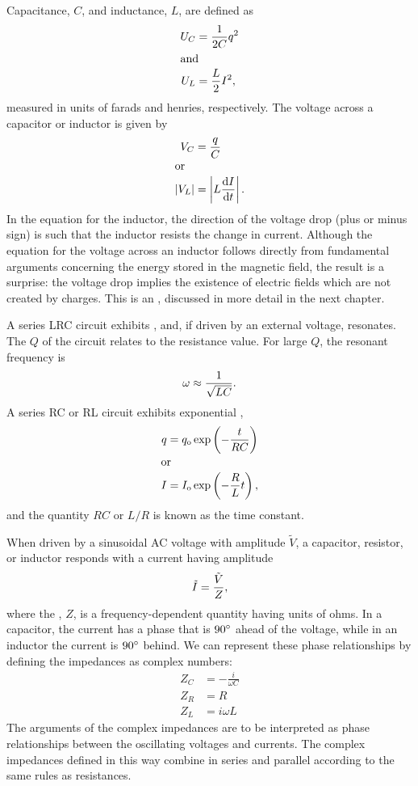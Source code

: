	Capacitance, $C$, and inductance, $L$, are defined as
	\begin{align*}
		U_C    &=   \frac{1}{2C}q^2    \\
	\intertext{and}
		U_L    &=    \frac{L}{2}I^2,
	\end{align*}
	measured in units of farads and henries, respectively.
	The voltage across a capacitor or inductor is given by
	\begin{align*}
		V_C	&= \frac{q}{C} \\
	\intertext{or}
		|V_L|	&= \left|L\frac{\operatorname{d\!} I}{\operatorname{d\!} t}\right|.
	\end{align*}
	In the equation for the inductor, the
	direction of the voltage drop (plus or minus sign) is such
	that the inductor resists the change in current.
	Although the equation for the voltage across an inductor follows
	directly from fundamental arguments concerning the energy
	stored in the magnetic field, the result is a surprise: the
	voltage drop implies the existence of electric fields which
	are not created by charges. This is an ,
	discussed in more detail in the next chapter.
	
	A series LRC circuit exhibits , and, if driven
	by an external voltage, resonates.
	The $Q$ of the circuit relates to the resistance value. For large
	$Q$, the resonant frequency is
	\begin{equation*}
	  \omega \approx \frac{1}{\sqrt{LC}}.
	\end{equation*}
	A series RC or RL circuit exhibits exponential ,
	\begin{align*}
		q &= q_{\textup{o}}\exp\left(-\frac{t}{RC}\right) \\
	\intertext{or}
		I &= I_{\textup{o}}\exp\left(-\frac{R}{L}t\right),
	\end{align*}
	and the quantity $RC$ or $L/R$ is known as the time constant.

	When driven by a sinusoidal AC voltage with amplitude $\tilde{V}$,
	a capacitor, resistor, or inductor responds with a current
	having amplitude
	\begin{equation*}
		\tilde{I} = \frac{\tilde{V}}{Z},
	\end{equation*}
	where the , $Z$, is a frequency-dependent quantity
	having units of ohms.
	In a capacitor, the current has a phase that is $90\mspace{0mu}^\circ$ ahead of the voltage,
	while in an inductor the current is $90\mspace{0mu}^\circ$ behind.
        We can represent these phase relationships by defining the impedances
	 as complex numbers:
	 \begin{align*}
		Z_C &= -\frac{i}{\omega C}\\
		Z_R	&= R\\
		Z_L &= i\omega L 
	\end{align*}
	The arguments of the complex impedances are to be interpreted as phase relationships between the
	oscillating voltages and currents.
	The complex impedances defined in this way combine in series and parallel
	 according to the same rules as resistances.

